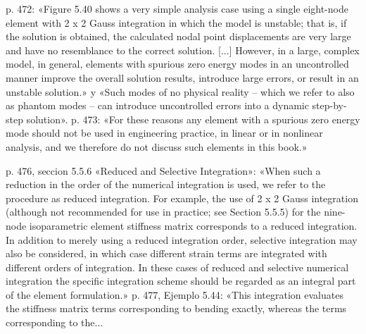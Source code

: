 \documentclass[11pt,a4paper]{article}
\newcommand{\campo}[1]{\textcolor{gris}{\footnotesize #1}}
\begin{document}
\vspace{3pt}\noindent{\small\textbf{p.\ 472 y 473} \quad \campo{«Los modos espurios (hourglass) [...] surgen al subintegrar la rigidez [...] la matriz elemental queda con rango deficiente y admite modos de deformacion de energia nula, patrones no fisicos que contaminan la solucion. EduFEM los evita empleando la integracion completa de cada elemento (2x2 para Q4 y 3x3 para Q9)» ---...}}\par
\begin{pasaje}\footnotesize p. 472: «Figure 5.40 shows a very simple analysis case using a single eight-node element with 2 x 2 Gauss integration in which the model is unstable; that is, if the solution is obtained, the calculated nodal point displacements are very large and have no resemblance to the correct solution. [...] However, in a large, complex model, in general, elements with spurious zero energy modes in an uncontrolled manner improve the overall solution results, introduce large errors, or result in an unstable solution.» y «Such modes of no physical reality -- which we refer to also as \textquotedbl{}phantom\textquotedbl{} modes -- can introduce uncontrolled errors into a dynamic step-by-step solution». \textbar{}\textbar{} p. 473: «For these reasons any element with a spurious zero energy mode should not be used in engineering practice, in linear or in nonlinear analysis, and we therefore do not discuss such elements in this book.»\end{pasaje}
\vspace{3pt}\noindent{\small\textbf{p.\ 476 (y 477)} \quad \campo{«Existen tecnicas correctivas [...] entre ellas la integracion reducida selectiva (SRI), que subintegra solo los terminos responsables del bloqueo, y la formulacion B-bar, que proyecta la parte volumetrica o de corte de la deformacion» --- tesis/capitulos/02\_marco\_teorico.tex:257 y, con la misma redaccion,...}}\par
\begin{pasaje}\footnotesize p. 476, seccion 5.5.6 «Reduced and Selective Integration»: «When such a reduction in the order of the numerical integration is used, we refer to the procedure as reduced integration. For example, the use of 2 x 2 Gauss integration (although not recommended for use in practice; see Section 5.5.5) for the nine-node isoparametric element stiffness matrix corresponds to a reduced integration. In addition to merely using a reduced integration order, selective integration may also be considered, in which case different strain terms are integrated with different orders of integration. In these cases of reduced and selective numerical integration the specific integration scheme should be regarded as an integral part of the element formulation.» \textbar{}\textbar{} p. 477, Ejemplo 5.44: «This integration evaluates the stiffness matrix terms corresponding to bending exactly, whereas the terms corresponding to the...\end{pasaje}
\end{document}
